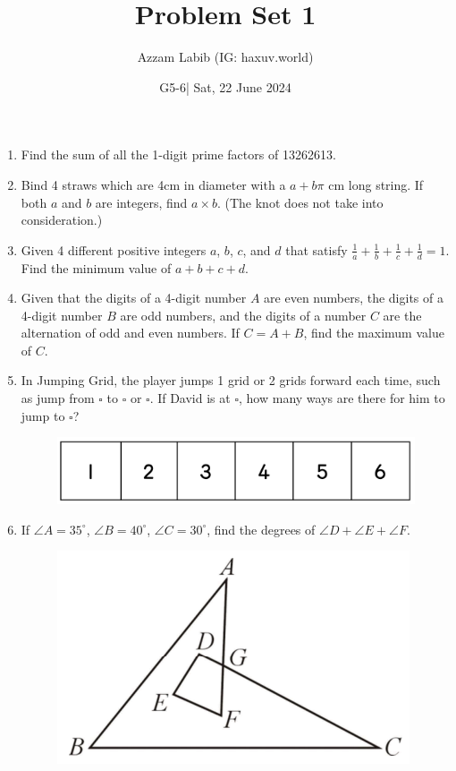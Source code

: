 \documentclass[11pt]{scrartcl}
\title{Problem Set 1}
\author{Azzam Labib (IG: haxuv.world)}
\date{G5-6| Sat, 22 June 2024}
\begin{document}
\maketitle

\begin{enumerate}
    \item Find the sum of all the 1-digit prime factors of 13262613.

    \item Bind 4 straws which are 4cm in diameter with a $a+b\pi$ cm long string. If both $a$ and $b$ are integers, find $a \times b$. (The knot does not take into consideration.)

    \item Given 4 different positive integers $a$, $b$, $c$, and $d$ that satisfy $\frac{1}{a} + \frac{1}{b} + \frac{1}{c} + \frac{1}{d} = 1$. Find the minimum value of $a+b+c+d$.

    \item Given that the digits of a 4-digit number $A$ are even numbers, the digits of a 4-digit number $B$ are odd numbers, and the digits of a number $C$ are the alternation of odd and even numbers. If $C = A + B$, find the maximum value of $C$.

    \item In Jumping Grid, the player jumps 1 grid or 2 grids forward each time, such as jump from $\square$ to $\square$ or $\square$. If David is at $\square$, how many ways are there for him to jump to $\square$?
    \begin{figure}[h]
        \centering
        \includegraphics[scale=0.5]{StarGen/0Figure/jumping-grid-wmi-2020-g5-6.png}
    \end{figure}

    \item If $\angle A = 35^\circ$, $\angle B = 40^\circ$, $\angle C = 30^\circ$, find the degrees of $\angle D + \angle E + \angle F$.
    \begin{figure}[h]
        \centering
        \includegraphics[scale=1.05]{StarGen/0Figure/weird-triangle-wmi-2020-g5-6.png}
    \end{figure}


\end{enumerate}
\end{document}
